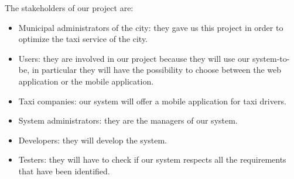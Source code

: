 The stakeholders of our project are:
\begin{itemize}
\item Municipal administrators of the city: they gave us this project in order to optimize the taxi service of the city.
\item Users: they are involved in our project because they will
use our system-to-be, in particular they will have the possibility to choose between the web application or the mobile application.
\item Taxi companies: our system will offer a mobile application for taxi drivers.
\item System administrators: they are the managers of our system.
\item Developers: they will develop the system.
\item Testers: they will have to check if our system respects all the requirements that have been identified.
\end{itemize}